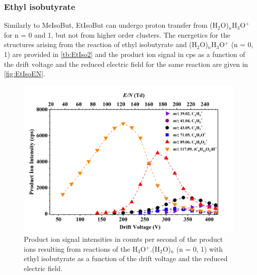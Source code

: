










\subsubsection{Ethyl isobutyrate}


Similarly to MeIsoBut, EtIsoBut can undergo proton transfer from (H$_2$O)$_n$H$_3$O$^+$ for n = 0 and 1, but not from higher order clusters.
%
The energetics for the structures arising from the reaction of ethyl isobutyrate and (H$_2$O)$_n$H$_3$O$^+$ (n = 0, 1) are provided in \autoref{tb:EtIso2} and the product ion signal in cps as a function of the drift voltage and the reduced electric field for the same reaction are given in \autoref{fig:EtIsoEN}.



\begin{figure}[htbp]
\centering
\includegraphics[width=0.8\linewidth]{pics/cocaine-chapter/EtIsobyturate-cps.png}
\caption{Product ion signal intensities in counts per second of the product ions resulting from reactions of the H$_3$O$^+$.(H$_2$O)$_n$ (n = 0, 1) with ethyl isobutyrate as a function of the drift voltage and the reduced electric field.} 
\label{fig:EtIsoEN}
\end{figure}

